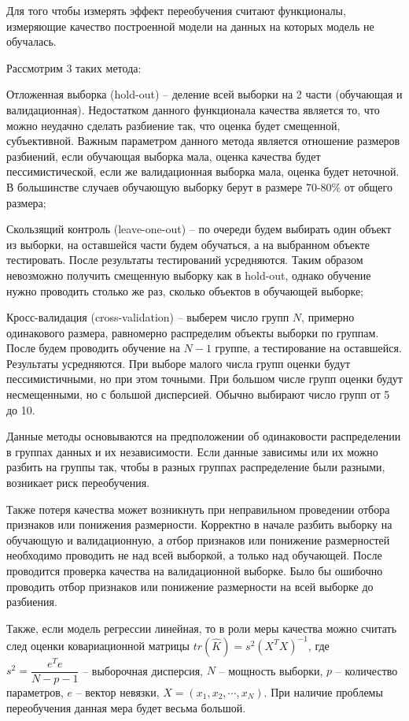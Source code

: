 Для того чтобы измерять эффект переобучения считают функционалы, измеряющие качество построенной модели на данных на которых модель не обучалась. 

Рассмотрим 3 таких метода:
\begin{description}[font=$\bullet$]
    \item Отложенная выборка (hold-out) -- деление всей выборки на 2 части (обучающая и валидационная). Недостатком данного функционала качества является то, что можно неудачно сделать разбиение так, что оценка будет смещенной, субъективной. Важным параметром данного метода является отношение размеров разбиений, если обучающая выборка мала, оценка качества будет пессимистической, если же валидационная выборка мала, оценка будет неточной. В большинстве случаев обучающую выборку берут в размере 70-80\% от общего размера;
    \item Скользящий контроль (leave-one-out) -- по очереди будем выбирать один объект из выборки, на оставшейся части будем обучаться, а на выбранном объекте тестировать. После результаты тестирований усредняются. Таким образом невозможно получить смещенную выборку как в hold-out, однако обучение нужно проводить столько же раз, сколько объектов в обучающей выборке;
    \item Кросс-валидация (cross-validation) -- выберем число групп $N$, примерно одинакового размера, равномерно распределим объекты выборки по группам. После будем проводить обучение на $N-1$ группе, а тестирование на оставшейся. Результаты усредняются. При выборе малого числа групп оценки будут пессимистичными, но при этом точными. При большом числе групп оценки будут несмещенными, но с большой дисперсией. Обычно выбирают число групп от 5 до 10.
\end{description}
Данные методы основываются на предположении об одинаковости распределении в группах данных и их независимости. Если данные зависимы или их можно разбить на группы так, чтобы в разных группах распределение были разными, возникает риск переобучения.

Также потеря качества может возникнуть при неправильном проведении отбора признаков или понижения размерности. Корректно в начале разбить выборку на обучающую и валидационную, а отбор признаков или понижение размерностей необходимо проводить не над всей выборкой, а только над обучающей. После проводится проверка качества на валидационной выборке. Было бы ошибочно проводить отбор признаков или понижение размерности на всей выборке до разбиения.

Также, если модель регрессии линейная, то в роли меры качества можно считать след оценки ковариационной матрицы $tr(\hat{K}) = s^2 (X^T X)^{-1}$, где $s^2 = \dfrac{e^T e}{N-p-1}$ -- выборочная дисперсия, $N$ -- мощность выборки, $p$ -- количество параметров, $e$ -- вектор невязки, $X=(x_1,x_2,\cdots,x_N)$. При наличие проблемы переобучения данная мера будет весьма большой.

